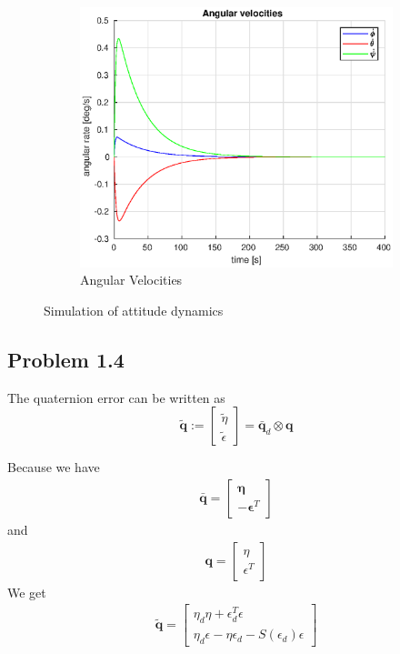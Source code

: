 \begin{figure}[h]
    \begin{subfigure}[b]{0.45\textwidth}
        \includegraphics[width=\textwidth]{plots/angular_velocities_13.eps}
        \caption{Angular Velocities}
        \label{fig:angular}
    \end{subfigure}
    \caption{Simulation of attitude dynamics}\label{fig:onethree}
\end{figure}


\subsection*{Problem 1.4}
The quaternion error can be written as
 \begin{equation}
	 \tilde{\mathbf{q}} := \left[
	 \begin{array}{c}
		 \tilde{\eta} \\
		 \tilde{\epsilon}
	 \end{array}
	 \right] = \bar{\mathbf{q}}_d \otimes \mathbf{q} 
 \end{equation}
 
 Because we have 
 \begin{align}
     \bar{\boldsymbol{q}} = 
     \begin{bmatrix}
         \boldsymbol{\eta} \\
         -\boldsymbol{\epsilon}^T
     \end{bmatrix}
 \end{align}
 and
 \begin{align}
     \boldsymbol{q} = 
     \begin{bmatrix}
         {\eta} \\
         {\epsilon}^T
     \end{bmatrix}
 \end{align}
 We get
 \begin{align}
     \boldsymbol{\tilde{q}} = 
     \begin{bmatrix}
         \eta_d\eta + \epsilon_d^T\epsilon \\
         \eta_d\epsilon - \eta\epsilon_d - S(\epsilon_d)\epsilon
     \end{bmatrix}
 \end{align}
 
